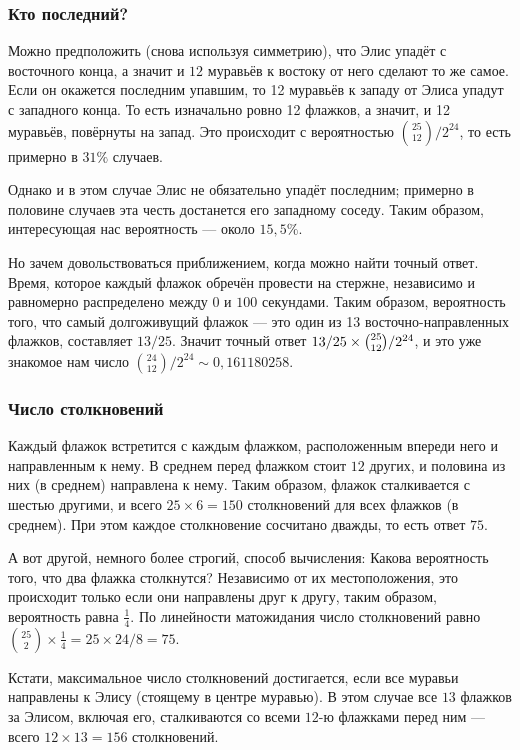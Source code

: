 \subsubsection*{Кто последний?}

Можно предположить (снова используя симметрию), что Элис упадёт с восточного конца,
а значит и $12$ муравьёв к востоку от него сделают то же самое.
Если он окажется последним упавшим, то 12 муравьёв к западу от Элиса упадут с западного конца.
То есть изначально ровно 12 флажков, а значит, и 12 муравьёв, повёрнуты на запад.
Это происходит с вероятностью $\binom{25}{12}/2^{24}$, то есть примерно в $31\%$ случаев.

Однако и в этом случае Элис не обязательно упадёт последним;
примерно в половине случаев эта честь достанется его западному соседу.
Таким образом, интересующая нас вероятность --- около $15{,}5\%$.

{\sloppy 

Но зачем довольствоваться приближением, когда можно найти точный ответ.
Время, которое каждый флажок обречён провести на стержне, независимо и равномерно распределено между $0$ и $100$ секундами.
Таким образом, вероятность того, что самый долгоживущий флажок --- это один из 13 восточно-направленных флажков, составляет $13/25$.
Значит точный ответ $13/25 \z\times\binom{25}{12}/2^{24}$, и это уже знакомое нам число $\binom{24}{12}/2^{24}\sim 0{,}161180258$.

}

\subsubsection*{Число столкновений}

Каждый флажок встретится с каждым флажком, расположенным впереди него и направленным к нему.
В среднем перед флажком стоит $12$ других, и
половина из них (в среднем) направлена к нему.
Таким образом, флажок сталкивается с шестью другими, и всего $25 \times 6 = 150$ столкновений для всех флажков (в среднем).
При этом каждое столкновение сосчитано дважды, то есть ответ $75$.

А вот другой, немного более строгий, способ вычисления:
Какова вероятность того, что два флажка столкнутся?
Независимо от их местоположения, это происходит только если они направлены друг к другу,
таким образом, вероятность равна $\tfrac14$.
По линейности матожидания число столкновений равно $\binom{25}2 \times \tfrac14 = 25 \times 24 /8 = 75$.

Кстати, максимальное число столкновений достигается, если все муравьи направлены к Элису (стоящему в центре муравью).
В этом случае все $13$ флажков за Элисом, включая его, сталкиваются со всеми $12$-ю флажками перед ним --- всего $12 \times 13 = 156$ столкновений.

